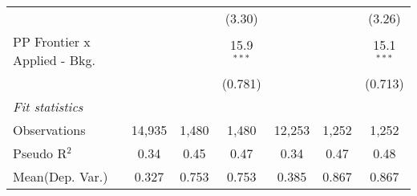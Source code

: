 \begin{tabular}{lcccccc}
                                  &                &                & (3.30)        &                &               & (3.26)\\   
   PP Frontier x Applied - Bkg.   &                &                & 15.9$^{***}$  &                &               & 15.1$^{***}$\\   
                                  &                &                & (0.781)       &                &               & (0.713)\\   
   \midrule
   \emph{Fit statistics}\\
   Observations                   & 14,935         & 1,480          & 1,480         & 12,253         & 1,252         & 1,252\\  
   Pseudo R$^2$                   & 0.34           & 0.45           & 0.47          & 0.34           & 0.47          & 0.48\\  
Mean(Dep. Var.) & 0.327 & 0.753 & 0.753 & 0.385 & 0.867 & 0.867 \\
   

\end{tabular}
